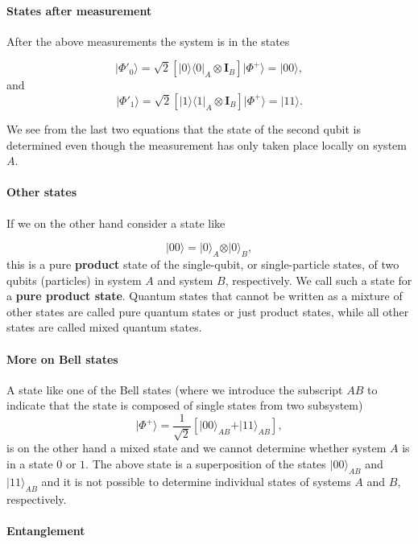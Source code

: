 \paragraph{States after measurement}
After the above measurements the system is in the states

\[
\vert \Phi'_0 \rangle = \sqrt{2}\left[\vert 0\rangle\langle 0\vert_A\otimes \bm{I}_B\right]\vert\Phi^+\rangle=\vert 00\rangle,
\]
and 
\[
\vert \Phi'_1 \rangle = \sqrt{2}\left[\vert 1\rangle\langle 1\vert_A\otimes \bm{I}_B\right]\vert\Phi^+\rangle=\vert 11\rangle.
\]

We see from the last two equations that the state of the second qubit
is determined even though the measurement has only taken place locally
on system $A$.


\paragraph{Other states}

If we on the other hand consider a state like

\[
\vert 00 \rangle = \vert 0\rangle_A\otimes \vert 0\rangle_B,
\]
this is a pure \textbf{product} state of the single-qubit, or single-particle
states, of two qubits (particles) in system $A$ and system $B$,
respectively. We call such a state for a \textbf{pure product state}.  Quantum states
that cannot be written as a mixture of other states are called pure
quantum states or just product states, while all other states are called mixed quantum states.


\paragraph{More on Bell states}
A state like one of the Bell states (where we introduce the subscript $AB$ to indicate that the state is composed of single states from two subsystem)
\[
\vert \Phi^+\rangle = \frac{1}{\sqrt{2}}\left[\vert 00\rangle_{AB} +\vert 11\rangle_{AB}\right],
\]
is on the other hand a mixed state and we cannot determine whether system $A$ is in a state $0$ or $1$. The above state is a superposition of the states $\vert 00\rangle_{AB}$ and $\vert 11\rangle_{AB}$ and it is not possible to determine individual states of systems $A$ and $B$, respectively.


\paragraph{Entanglement}

